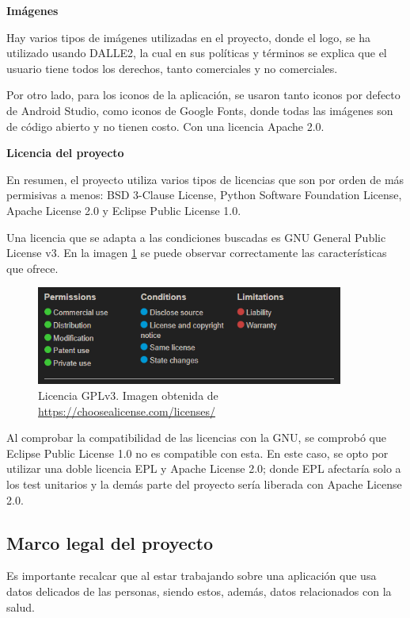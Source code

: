 \textbf{Imágenes}

Hay varios tipos de imágenes utilizadas en el proyecto, donde el logo, se ha utilizado usando DALLE2, la cual en sus políticas y términos se explica que el usuario tiene todos los derechos, tanto comerciales y no comerciales.

Por otro lado, para los iconos de la aplicación, se usaron tanto iconos por defecto de Android Studio, como iconos de Google Fonts, donde todas las imágenes son de código abierto y no tienen costo. Con una licencia Apache 2.0.




\textbf{Licencia del proyecto}

En resumen, el proyecto utiliza varios tipos de licencias que son por orden de más permisivas a menos:  BSD 3-Clause License, Python Software Foundation License, Apache License 2.0 y Eclipse Public License 1.0.

Una licencia que se adapta a las condiciones buscadas es GNU General Public License v3. En la imagen \ref{fig:Licencia GPLv3} se puede observar correctamente las características que ofrece.
\begin{figure}[!ht]
         \centering
         \includegraphics[width=0.9\textwidth]{img/GPLv3.png}
         \caption{Licencia GPLv3. Imagen obtenida de \url{https://choosealicense.com/licenses/}}
         \label{fig:Licencia GPLv3}
\end{figure}

Al comprobar la compatibilidad de las licencias con la GNU, se comprobó que Eclipse Public License 1.0 no es compatible con esta.
En este caso, se opto por utilizar una doble licencia EPL y Apache License 2.0; donde EPL afectaría solo a los test unitarios y la demás parte del proyecto sería liberada con Apache License 2.0.



\subsection{Marco legal del proyecto}

Es importante recalcar que al estar trabajando sobre una aplicación que usa datos delicados de las personas, siendo estos, además, datos relacionados con la salud. 

